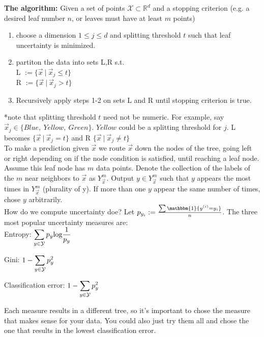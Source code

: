 \documentclass[10pt]{article}
\begin{document}
		\textbf{The algorithm:} Given a set of points $\mathcal X \subset \mathbb{R}^d$ and a stopping criterion 
			\indent (e.g. a desired leaf number $n$, or leaves must have at least $m$ points)
		\begin{enumerate}
			\item choose a dimension $1 \leq j \leq d$ and splitting threshold $t$ such that leaf uncertainty is minimized. 
			\item partiton the data into sets L,R s.t. \\
				L $:= \{\vec x \ | \ \vec x_j \leq t \}$\\
				R $:= \{\vec x \ | \ \vec x_j > t  \}$
			\item Recursively apply steps 1-2 on sets L and R until stopping criterion is true. 
		\end{enumerate} 
		\indent \indent **note that splitting threshold $t$ need not be numeric. For example, say 
		\indent $\vec x_j \in \{ Blue, \ Yellow, \ Green \} $. $Yellow$ could be a splitting threshold for $j$. 
		\indent L  becomes $\{\vec x \ | \ \vec x_j = t \}$ and R $ \{\vec x \ | \ \vec x_j \not = t \}$ \\ 
		
		\noindent To make a prediction given $\vec x $ we route $\vec x$ down the nodes of the tree, going left or 
		right depending on if the node condition is satisfied, until reaching a leaf node. Assume this leaf node has $m$ 
		data points. Denote the collection of the labels of the $m$ near neighbors to $\vec x$ as $Y_{\vec x}^m $. 
		Output $y \in Y_{\vec x}^m $ such that $y$ appears the most times in $Y_{\vec x}^m $ (plurality of y). 
		If more than one $y$ appear the same number of times, chose $y$ arbitrarily. \\
		
		How do we compute uncertainty doe? Let $p_{y_i} :=  \frac{ \sum\mathbbm{1} \{y^{(i)} = y_i \} }{n}  $.
		The three most popular uncertainty measures are: \\
		
		Entropy: \indent \indent \indent $ \mathlarger{ \sum_{y \in \mathcal{Y}} p_y \textrm{log} \frac{1}{p_y} } $
		
		Gini: \indent \indent \indent \indent $ \mathlarger{1 - \sum_{y \in \mathcal{Y}} p_y^2 }$
		
		Classification error:  $ \mathlarger{1 - \sum_{y \in \mathcal{Y}} p_y^2 } $
		
		Each measure results in a different tree, so it's important to chose the measure that makes sense for your
		data. You could also just try them all and chose the one that results in the lowest classification error. 
\end{document}
